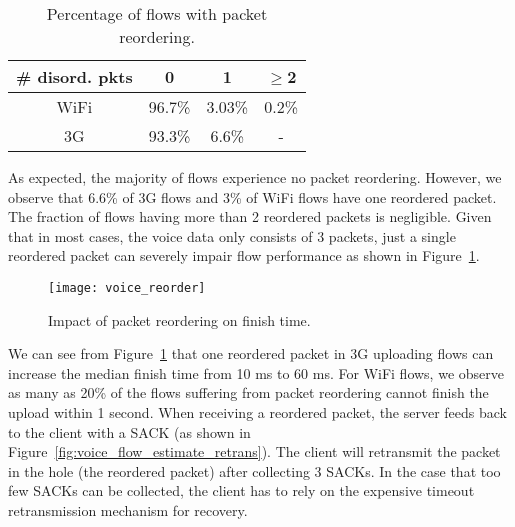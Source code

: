 
\begin{table}[th]
\caption{Percentage of flows with packet reordering.}
\label{tab:voice_reorder}
\centering
\renewcommand{\arraystretch}{1.0}
\begin{tabular}{c|c|c|c}
	\hline
	\# disord. pkts & 0 & 1 & $\ge$2 \\
	\hline
	WiFi & 96.7\% & 3.03\% & 0.2\% \\
	\hline
	3G & 93.3\% & 6.6\% & - \\
	\hline
\end{tabular}
\end{table}

As expected, the majority of flows experience no packet reordering. However, we observe that 6.6\% of 3G flows and 3\% of WiFi flows have one reordered packet. The fraction of flows having more than 2 reordered packets is negligible. Given that in most cases, the voice data only consists of 3 packets, just a single reordered packet can severely impair flow performance as shown in Figure~\ref{fig:voice_reorder}.

\begin{figure}[th]
\centering
	\texttt{[image: voice\_reorder]}
\caption{Impact of packet reordering on finish time.}
\label{fig:voice_reorder}
\end{figure}

We can see from Figure~\ref{fig:voice_reorder} that one reordered packet in 3G uploading flows can increase the median finish time from 10 ms to 60 ms. For WiFi flows, we observe as many as 20\% of the flows suffering from packet reordering cannot finish the upload within 1 second. When receiving a reordered packet, the server feeds back to the client with a SACK (as shown in Figure~\ref{fig:voice_flow_estimate_retrans}). The client will retransmit the packet in the hole (\ie the reordered packet) after collecting 3 SACKs. In the case that too few SACKs can be collected, the client has to rely on the expensive timeout retransmission mechanism for recovery. %

